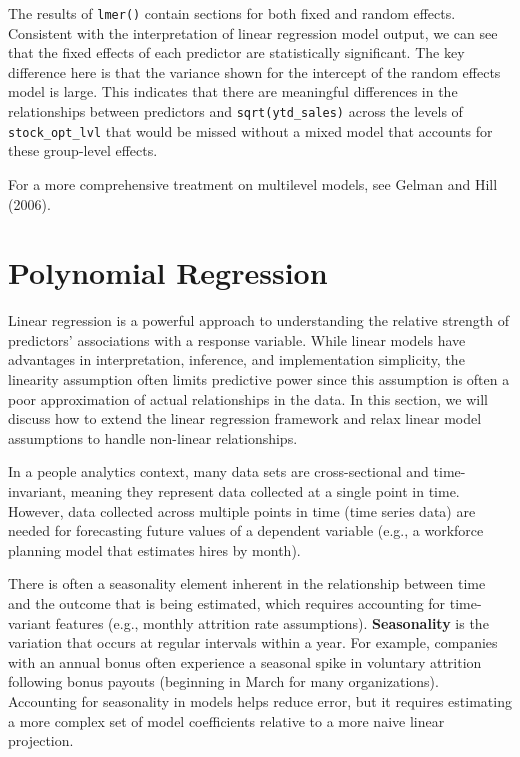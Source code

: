 \documentclass[
]{book}
\begin{document}
The results of \texttt{lmer()} contain sections for both fixed and random effects. Consistent with the interpretation of linear regression model output, we can see that the fixed effects of each predictor are statistically significant. The key difference here is that the variance shown for the intercept of the random effects model is large. This indicates that there are meaningful differences in the relationships between predictors and \texttt{sqrt(ytd\_sales)} across the levels of \texttt{stock\_opt\_lvl} that would be missed without a mixed model that accounts for these group-level effects.

For a more comprehensive treatment on multilevel models, see Gelman and Hill (2006).

\hypertarget{polynomial-regression}{%
\section{Polynomial Regression}\label{polynomial-regression}}

Linear regression is a powerful approach to understanding the relative strength of predictors' associations with a response variable. While linear models have advantages in interpretation, inference, and implementation simplicity, the linearity assumption often limits predictive power since this assumption is often a poor approximation of actual relationships in the data. In this section, we will discuss how to extend the linear regression framework and relax linear model assumptions to handle non-linear relationships.

In a people analytics context, many data sets are cross-sectional and time-invariant, meaning they represent data collected at a single point in time. However, data collected across multiple points in time (time series data) are needed for forecasting future values of a dependent variable (e.g., a workforce planning model that estimates hires by month).

There is often a seasonality element inherent in the relationship between time and the outcome that is being estimated, which requires accounting for time-variant features (e.g., monthly attrition rate assumptions). \textbf{Seasonality} is the variation that occurs at regular intervals within a year. For example, companies with an annual bonus often experience a seasonal spike in voluntary attrition following bonus payouts (beginning in March for many organizations). Accounting for seasonality in models helps reduce error, but it requires estimating a more complex set of model coefficients relative to a more naive linear projection.
\end{document}
